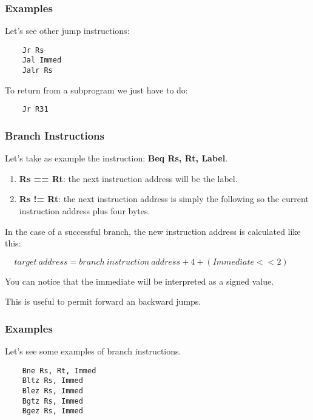
\begin{frame}[containsverbatim]
  \frametitle{Examples}

  Let's see other jump instructions:

  \begin{verbatim}
    Jr Rs
    Jal Immed
    Jalr Rs
  \end{verbatim}

  To return from a subprogram we just have to do:

  \begin{verbatim}
    Jr R31
  \end{verbatim}
\end{frame}


\begin{frame}
  \frametitle{Branch Instructions}

  Let's take as example the instruction: \textbf{Beq Rs, Rt, Label}.

  \begin{enumerate}
    \item
      \textbf{Rs == Rt}: the next instruction address will be the label.
    \item
      \textbf{Rs != Rt}: the next instruction address is simply the following
      so the current instruction address plus four bytes.
  \end{enumerate}

  \nl

  In the case of a successful branch, the new instruction address is
  calculated like this:

  \nl

  $~~~~~target~address = branch~instruction~address + 4 + (Immediate << 2)$

  \nl

  You can notice that the immediate will be interpreted as a signed value.

  \nl

  This is useful to permit forward an backward jumps.
\end{frame}


\begin{frame}[containsverbatim]
  \frametitle{Examples}

  Let's see some examples of branch instructions.

  \begin{verbatim}
    Bne Rs, Rt, Immed
    Bltz Rs, Immed
    Blez Rs, Immed
    Bgtz Rs, Immed
    Bgez Rs, Immed
  \end{verbatim}
\end{frame}

